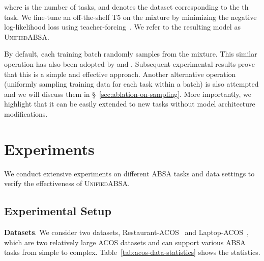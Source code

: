 \documentclass[11pt]{article}
\newcommand{\UnifiedABSA}{\textsc{UnifiedABSA}\xspace}
\begin{document}
where  is the number of tasks, and  denotes the dataset corresponding to the  th task. We fine-tune an off-the-shelf T5 on the mixture  by minimizing the negative log-likelihood loss using teacher-forcing~\citep{DBLP:journals/neco/WilliamsZ89}.  We refer to the resulting model as \UnifiedABSA.



By default, each training batch randomly samples from the mixture. This similar operation has also been adopted by \citet{raffel2020t5} and \citet{khashabi-etal-2020-unifiedqa}. Subsequent experimental results prove that this is a simple and effective approach. Another alternative operation (uniformly sampling training data for each task within a batch) is also attempted and we will discuss them in \S~\ref{sec:ablation-on-sampling}. More importantly, we highlight that it can be easily extended to new tasks without model architecture modifications. 


\section{Experiments}

We conduct extensive experiments on different ABSA tasks and data settings to verify the effectiveness of \UnifiedABSA.

\subsection{Experimental Setup}
\label{sec:exp-setup}

\noindent\textbf{Datasets}. We consider two datasets, Restaurant-ACOS~\citep{cai-etal-2021-acos} and Laptop-ACOS~\citep{cai-etal-2021-acos}, which are two relatively large ACOS datasets and can support various ABSA tasks from simple to complex. Table~\ref{tab:acos-data-statistics} shows the statistics.





\begin{table}[htbp]
\centering
{}
\caption{Statistics of Restaurant-ACOS and Laptop-ACOS deriving from~\citet{cai-etal-2021-acos}. \#Cate. and \#Quad. denote the number of unique categories and ACOS quadruples contained in the dataset, respectively.}
\label{tab:acos-data-statistics}  
\end{table}
 
\end{document}
